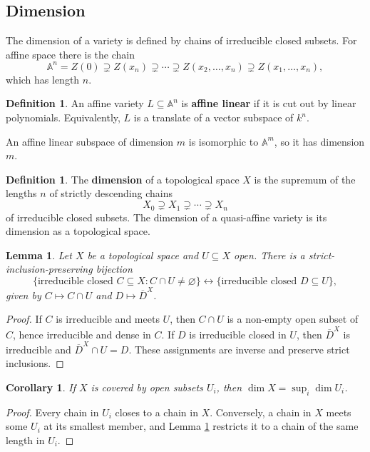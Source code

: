 \documentclass[12pt]{article}
\theoremstyle{plain}
\newtheorem{lemma}[thm]{Lemma}
\newtheorem{cor}[thm]{Corollary}
\theoremstyle{definition}
\newtheorem{defn}[thm]{Definition} %
\newcommand{\bb}[1]{\mathbb{#1}}
\begin{document}
\subsection{Dimension}\label{sec:dimension}
The dimension of a variety is defined by chains of irreducible closed subsets. For affine space there is the chain
\begin{equation}\label{eq:dimension_chain}
\bb A^n=Z(0)\supsetneq Z(x_n)\supsetneq\cdots\supsetneq Z(x_2,\ldots,x_n)\supsetneq Z(x_1,\ldots,x_n),
\end{equation}
which has length $n$.
\begin{defn}
An affine variety $L\subseteq\bb A^n$ is \textbf{affine linear} if it is cut out by linear polynomials. Equivalently, $L$ is a translate of a vector subspace of $k^n$.
\end{defn}
An affine linear subspace of dimension $m$ is isomorphic to $\bb A^m$, so it has dimension $m$.
\begin{defn}\label{def:dimension_var}
The \textbf{dimension} of a topological space $X$ is the supremum of the lengths $n$ of strictly descending chains
\[
X_0\supsetneq X_1\supsetneq\cdots\supsetneq X_n
\]
of irreducible closed subsets. The dimension of a quasi-affine variety is its dimension as a topological space.
\end{defn}
\begin{lemma}\label{lem:the_lemma_never_stated}
Let $X$ be a topological space and $U\subseteq X$ open. There is a strict-inclusion-preserving bijection
\[
\{\text{irreducible closed }C\subseteq X:C\cap U\neq\varnothing\}
\longleftrightarrow
\{\text{irreducible closed }D\subseteq U\},
\]
given by $C\mapsto C\cap U$ and $D\mapsto\overline D^{X}$.
\end{lemma}
\begin{proof}
If $C$ is irreducible and meets $U$, then $C\cap U$ is a non-empty open subset of $C$, hence irreducible and dense in $C$. If $D$ is irreducible closed in $U$, then $\overline D^X$ is irreducible and $\overline D^X\cap U=D$. These assignments are inverse and preserve strict inclusions.
\end{proof}
\begin{cor}\label{cor:dimension_open_cover}
If $X$ is covered by open subsets $U_i$, then $\dim X=\sup_i\dim U_i$.
\end{cor}
\begin{proof}
Every chain in $U_i$ closes to a chain in $X$. Conversely, a chain in $X$ meets some $U_i$ at its smallest member, and Lemma \ref{lem:the_lemma_never_stated} restricts it to a chain of the same length in $U_i$.
\end{proof}
\end{document}

